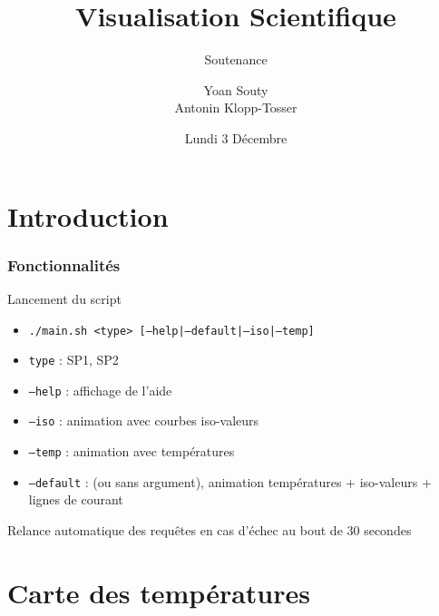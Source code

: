\documentclass{beamer}
\title[Visu Scientifique]{Visualisation Scientifique}
\subtitle{Soutenance} %
\author{Yoan Souty\\Antonin Klopp-Tosser}
\institute{Ensimag}
\date{Lundi 3 Décembre}
\begin{document}
\begin{frame}
  \titlepage
\end{frame}

\section[Intro]{Introduction}


\begin{frame} \frametitle{Fonctionnalités}

  \begin{block}{Lancement du script}
    \begin{itemize}
      \item \texttt{./main.sh <type> [--help|--default|--iso|--temp]}
      \item \texttt{type} : SP1, SP2
      \item \texttt{--help} : affichage de l'aide
      \item \texttt{--iso} : animation avec courbes iso-valeurs
      \item \texttt{--temp} : animation avec températures
      \item \texttt{--default} : (ou sans argument), animation températures + iso-valeurs + lignes de courant
    \end{itemize}
  \end{block}

  Relance automatique des requêtes en cas d'échec au bout de 30 secondes
\end{frame}


\section[Températures]{Carte des températures}
\end{document}
